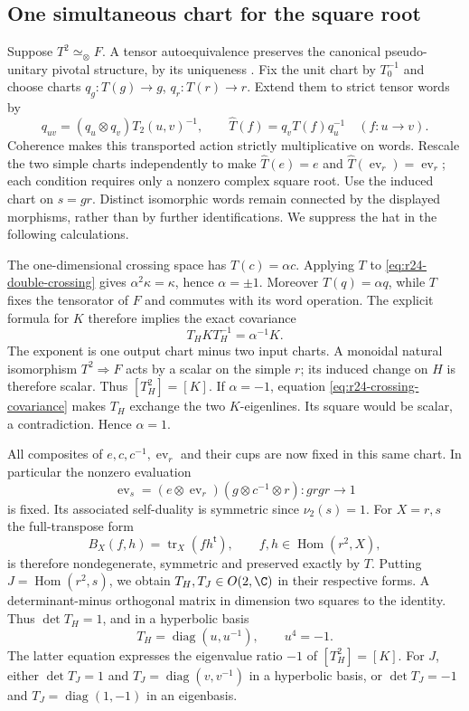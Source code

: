 \subsection{One simultaneous chart for the square root}
Suppose $T^2\simeq_\otimes F$. A tensor autoequivalence preserves the
canonical pseudo-unitary pivotal structure, by its uniqueness
\cite[Proposition~8.23]{ENO}. Fix the unit chart by $T_0^{-1}$ and
choose charts $q_g:T(g)\to g$, $q_r:T(r)\to r$. Extend them to strict
tensor words by
\[
 q_{uv}=(q_u\otimes q_v)T_2(u,v)^{-1},\qquad
 \widehat T(f)=q_vT(f)q_u^{-1}\quad(f:u\to v).
\]
Coherence makes this transported action strictly multiplicative on
words. Rescale the two simple charts independently to make
$\widehat T(e)=e$ and $\widehat T(\operatorname{ev}_r)=\operatorname{ev}_r$;
each condition requires only a nonzero complex square root. Use the
induced chart on $s=gr$. Distinct isomorphic words remain connected by
the displayed morphisms, rather than by further identifications.
We suppress the hat in the following calculations.

The one-dimensional crossing space has $T(c)=\alpha c$.
Applying $T$ to \eqref{eq:r24-double-crossing} gives
$\alpha^2\kappa=\kappa$, hence $\alpha=\pm1$.
Moreover $T(q)=\alpha q$, while $T$ fixes the tensorator of $F$ and
commutes with its word operation. The explicit formula for $K$ therefore
implies the exact covariance
\begin{equation}\label{eq:r24-crossing-covariance}
 T_HKT_H^{-1}=\alpha^{-1}K.
\end{equation}
The exponent is one output chart minus two input charts.
A monoidal natural isomorphism $T^2\Rightarrow F$ acts by a scalar
on the simple $r$; its induced change on $H$ is therefore scalar.
Thus $[T_H^2]=[K]$. If $\alpha=-1$, equation
\eqref{eq:r24-crossing-covariance} makes $T_H$ exchange the two
$K$-eigenlines. Its square would be scalar, a contradiction. Hence
$\alpha=1$.

All composites of $e,c,c^{-1},\operatorname{ev}_r$ and their cups
are now fixed in this same chart. In particular the nonzero evaluation
\begin{equation}\label{eq:r24-s-evaluation}
 \operatorname{ev}_s=(e\otimes\operatorname{ev}_r)
                  (g\otimes c^{-1}\otimes r):grgr\to1
\end{equation}
is fixed. Its associated self-duality is symmetric since
$\nu_2(s)=1$. For $X=r,s$ the full-transpose form
\[
 B_X(f,h)=\operatorname{tr}_X(fh^{\mathsf t}),
 \qquad f,h\in\operatorname{Hom}(r^2,X),
\]
is therefore nondegenerate, symmetric and preserved exactly by $T$.
Putting $J=\operatorname{Hom}(r^2,s)$, we obtain
$T_H,T_J\in O(2,\C)$ in their respective forms. A determinant-minus
orthogonal matrix in dimension two squares to the identity. Thus
$\det T_H=1$, and in a hyperbolic basis
\begin{equation}\label{eq:r24-u-fourth}
 T_H=\operatorname{diag}(u,u^{-1}),\qquad u^4=-1.
\end{equation}
The latter equation expresses the eigenvalue ratio $-1$ of $[T_H^2]=[K]$.
For $J$, either $\det T_J=1$ and
$T_J=\operatorname{diag}(v,v^{-1})$ in a hyperbolic basis, or
$\det T_J=-1$ and $T_J=\operatorname{diag}(1,-1)$ in an eigenbasis.

